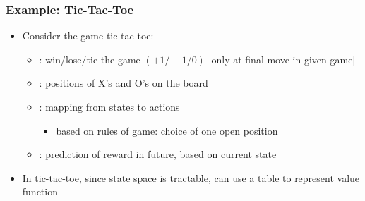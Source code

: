 \documentclass[handout]{beamer}
\begin{document}
\begin{frame}\frametitle{Example: Tic-Tac-Toe}\small
\begin{itemize}
\item Consider the game tic-tac-toe:
\begin{itemize}
\item {}:  win/lose/tie the game $(+1/-1/0)$ [only at final move in given game]
\item {}: positions of X's and O's on the board
\item {}: mapping from states to actions 
\begin{itemize}
\item based on rules of game: choice of one open position
\end{itemize}
\item {}: prediction of reward in future, based    on current state
\end{itemize}
\item In tic-tac-toe, since state space is tractable, can use a table to represent value function 
\end{itemize}
\end{frame}
\end{document}
